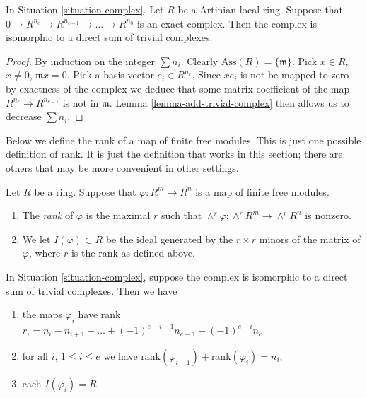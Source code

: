 \begin{lemma}
\label{lemma-exact-artinian-local}
In Situation \ref{situation-complex}.
Let $R$ be a Artinian local ring.
Suppose that $0 \to R^{n_e} \to R^{n_{e-1}}
\to \ldots \to R^{n_0}$ is an exact complex.
Then the complex is isomorphic to a direct sum of
trivial complexes.
\end{lemma}

\begin{proof}
By induction on the integer $\sum n_i$.
Clearly $\text{Ass}(R) = \{\mathfrak m\}$.
Pick $x \in R$, $x \not = 0$, $\mathfrak m x = 0$.
Pick a basis vector $e_i \in R^{n_e}$.
Since $xe_i$ is not be mapped to zero by
exactness of the complex we deduce that some matrix 
coefficient of the map $R^{n_e} \to R^{n_{e-1}}$
is not in $\mathfrak m$.
Lemma \ref{lemma-add-trivial-complex} then allows
us to decrease $\sum n_i$.
\end{proof}

\noindent
Below we define the rank of a map of finite free modules.
This is just one possible definition of rank. It 
is just the definition that works in this section; there
are others that may be more convenient in other settings.

\begin{definition}
\label{definition-rank}
Let $R$ be a ring. Suppose that $\varphi : R^m \to R^n$ is a map
of finite free modules.
\begin{enumerate}
\item The {\it rank} of $\varphi$ is the maximal $r$ such that
$\wedge^r \varphi : \wedge^r R^m \to \wedge^r R^n$ is nonzero.
\item We let $I(\varphi) \subset R$ be the ideal generated by
the $r\times r$ minors of the matrix of $\varphi$, where $r$
is the rank as defined above.
\end{enumerate}
\end{definition}

\begin{lemma}
\label{lemma-trivial-case-exact}
In Situation \ref{situation-complex}, suppose the complex is
isomorphic to a direct sum of trivial complexes. Then
we have
\begin{enumerate}
\item the maps $\varphi_i$ have rank
$r_i = n_i - n_{i+1} + \ldots + (-1)^{e-i-1} n_{e-1} + (-1)^{e-i} n_e$,
\item for all $i$, $1 \leq i \leq e$ we have
$\text{rank}(\varphi_{i+1}) + \text{rank}(\varphi_i) = n_i$,
\item each $I(\varphi_i) = R$.
\end{enumerate}
\end{lemma}

